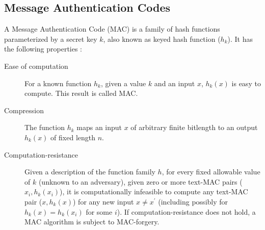 \documentclass[%
  slidesonly,%
  semlayer%
  ]{seminar}                                  %
\begin{document}
\begin{slide}
    \clearpage

  \subsection*{Message Authentication Codes}
    A Message Authentication Code (MAC) is a family of hash functions parameterized by a secret key $k$, also known as keyed hash function ($h_{k}$).
    It has the following properties :
    \begin{description}
      \item [Ease of computation] For a known function $h_{k}$, given a value $k$
      and an input $x$, $h_{k}(x)$ is easy to compute.
      This result is called MAC.
      \item [Compression] The function $h_{k}$ maps an input $x$ of arbitrary finite bitlength to an output $h_{k}(x)$ of fixed length $n$.  
      \item [Computation-resistance] Given a description of the function family $h$, for every fixed allowable value of $k$ (unknown to an adversary), given zero or more text-MAC pairs ($x_{i}, h_{k}(x_{i})$), it is computationally infeasible to compute any text-MAC pair ($x,h_{k}(x)$) for any new input $x \neq x^{'}$ (including possibly for $h_{k}(x) = h_{k}(x_{i})$ for some $i$). 
    If computation-resistance does not hold, a MAC algorithm is subject to MAC-forgery.
    \end{description}
    \clearpage


\end{slide}
\end{document}
